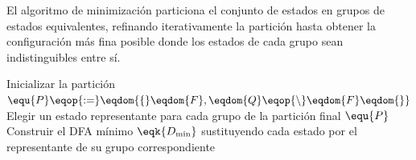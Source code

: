 El algoritmo de minimización particiona el conjunto de estados en grupos de estados equivalentes, refinando iterativamente la partición hasta obtener la configuración más fina posible donde los estados de cada grupo sean indistinguibles entre sí.

\begin{algorithm}[H]
\caption{Minimización de DFA \cite{aho2006compilers}}
\label{alg:minimize}
\BlankLine
Inicializar la partición $\equ{P} \eqop{:=} \eqdom{\{} \eqdom{F}, \eqdom{Q} \eqop{\setminus} \eqdom{F} \eqdom{\}}$\;
\BlankLine
Elegir un estado representante para cada grupo de la partición final $\equ{P}$\;
Construir el DFA mínimo $\eqk{D_{\min}}$ sustituyendo cada estado por el representante de su grupo correspondiente\;
\end{algorithm}

